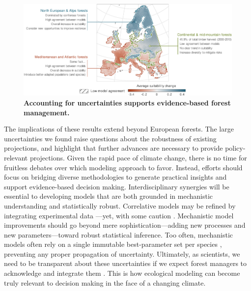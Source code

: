\documentclass[11pt,letter]{article}
\begin{document}
\begin{figure}
	\centering
	\includegraphics[width=1\linewidth]{../newfigures/files/formanag}
	\caption{\textbf{Accounting for uncertainties supports evidence-based forest management.}}
	\label{fig:manag}
\end{figure}


The implications of these results extend beyond European forests. The large uncertainties we found raise questions about the robustness of existing projections, and highlight that further advances are necessary to provide policy-relevant projections. Given the rapid pace of climate change, there is no time for fruitless debates over which modeling approach to favor. Instead, efforts should focus on bridging diverse methodologies to generate practical insights and support evidence-based decision making. Interdisciplinary synergies will be essential to developing models that are both grounded in mechanistic understanding and statistically robust. Correlative models may be refined by integrating experimental data \citep{Kuo2022}---yet, with some caution \citep{Chevalier2024a}. Mechanistic model improvements should go beyond mere sophistication---adding new processes and new parameters---toward robust statistical inference. Too often, mechanistic models often rely on a single immutable best-parameter set per species \citep{Harrison2021}, preventing any proper propagation of uncertainty. Ultimately, as scientists, we need to be transparent about these uncertainties if we expect forest managers to acknowledge and integrate them \citep{Saltelli2020}. This is how ecological modeling can become truly relevant to decision making in the face of a changing climate.
\end{document}
